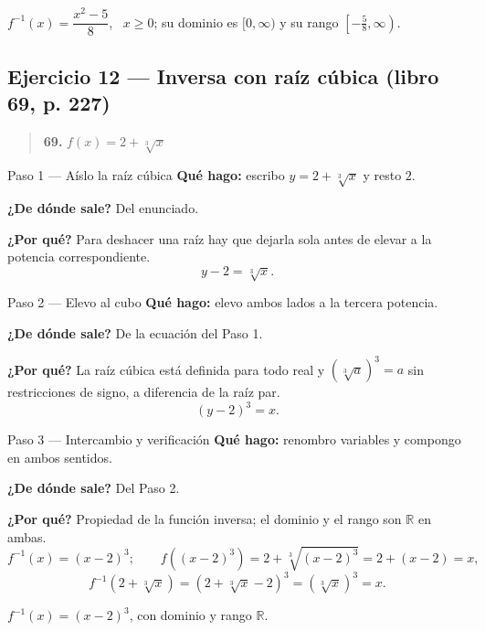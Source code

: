 \documentclass[11pt]{article}
\begin{document}
\begin{resp}
$f^{-1}(x)=\dfrac{x^2-5}{8}$, \ $x\ge 0$; su dominio es $[0,\infty)$ y su rango $\left[-\tfrac{5}{8},\infty\right)$.
\end{resp}

\subsection*{Ejercicio 12 --- Inversa con raíz cúbica (libro 69, p. 227)}

\begin{quote}
\textbf{69.} $f(x)=2+\sqrt[3]{x}$
\end{quote}

\begin{paso}{Paso 1 --- Aíslo la raíz cúbica}
\textbf{Qué hago:} escribo $y=2+\sqrt[3]{x}$ y resto $2$.

\textbf{¿De dónde sale?} Del enunciado.

\textbf{¿Por qué?} Para deshacer una raíz hay que dejarla sola antes de elevar a la potencia correspondiente.
\[
y-2=\sqrt[3]{x}.
\]
\end{paso}

\begin{paso}{Paso 2 --- Elevo al cubo}
\textbf{Qué hago:} elevo ambos lados a la tercera potencia.

\textbf{¿De dónde sale?} De la ecuación del Paso 1.

\textbf{¿Por qué?} La raíz cúbica está definida para todo real y $(\sqrt[3]{a})^3=a$ sin restricciones de signo, a diferencia de la raíz par.
\[
(y-2)^3=x.
\]
\end{paso}

\begin{paso}{Paso 3 --- Intercambio y verificación}
\textbf{Qué hago:} renombro variables y compongo en ambos sentidos.

\textbf{¿De dónde sale?} Del Paso 2.

\textbf{¿Por qué?} Propiedad de la función inversa; el dominio y el rango son $\mathbb{R}$ en ambas.
\[
f^{-1}(x)=(x-2)^3;\qquad
f\!\left((x-2)^3\right)=2+\sqrt[3]{(x-2)^3}=2+(x-2)=x,
\]
\[
f^{-1}\!\left(2+\sqrt[3]{x}\right)=\left(2+\sqrt[3]{x}-2\right)^3=\left(\sqrt[3]{x}\right)^3=x.
\]
\end{paso}

\begin{resp}
$f^{-1}(x)=(x-2)^3$, con dominio y rango $\mathbb{R}$.
\end{resp}
\end{document}
